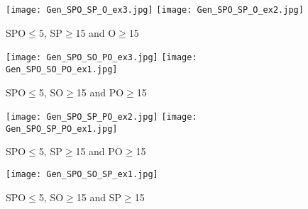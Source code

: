 \documentclass[runningheads]{llncs}
\begin{document}
\begin{figure}[h!]
\centering
   \caption{SPO$\le$5, SP$\ge$15 and O$\ge$15 }
   \texttt{[image: Gen\_SPO\_SP\_O\_ex3.jpg]}
   \texttt{[image: Gen\_SPO\_SP\_O\_ex2.jpg]}
\end{figure}




\clearpage


\begin{figure}[h!]
\centering
   \caption{SPO$\le$5, SO$\ge$15 and PO$\ge$15 }
   \texttt{[image: Gen\_SPO\_SO\_PO\_ex3.jpg]}
   \texttt{[image: Gen\_SPO\_SO\_PO\_ex1.jpg]}
\end{figure}


\clearpage












\begin{figure}[h!]
\centering
   \caption{SPO$\le$5, SP$\ge$15 and PO$\ge$15 }
   \texttt{[image: Gen\_SPO\_SP\_PO\_ex2.jpg]}
      \texttt{[image: Gen\_SPO\_SP\_PO\_ex1.jpg]}
\end{figure}








\clearpage




\begin{figure}[h!]
\centering
   \caption{SPO$\le$5, SO$\ge$15 and SP$\ge$15 }
   \texttt{[image: Gen\_SPO\_SO\_SP\_ex1.jpg]}
\end{figure}


\clearpage
\end{document}
